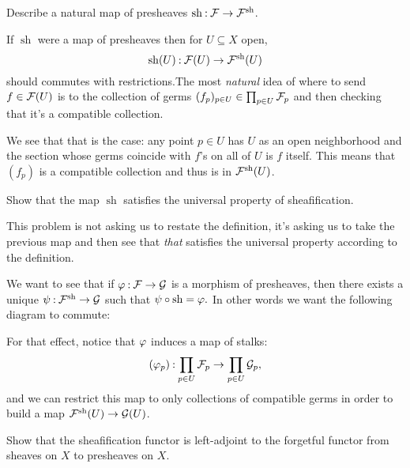 \documentclass[12pt]{memoir}
\DeclareMathOperator{\sh}{sh}
\begin{document}
\begin{Ej}[2.4.I. Vakil]
    Describe a natural map of presheaves $\text{sh}\mathbin{:}\mathcal{F}\to\mathcal{F}^{\text{sh}}$.
\end{Ej}

\begin{ptcbr}
    If $\sh$ were a map of presheaves then for $U\subseteq X$ open, 
    $$\sh(U)\:\cF(U)\to\cF^{\sh}(U)$$ 
    should commutes with restrictions.The most \emph{natural} idea of where to send $f\in\mathcal{F}(U)$ is to the collection of germs $(f_p)_{p\in U}\in \prod_{p\in U}\mathcal{F}_p$ and then checking that it's a compatible collection.\par 
    We see that that is the case: any point $p\in U$ has $U$ as an open neighborhood and the section whose germs coincide with $f$'s on all of $U$ is $f$ itself. This means that $(f_p)$ is a compatible collection and thus is in $\cF^{\sh}(U)$.\par
\end{ptcbr}

\begin{Ej}[2.4.J Vakil]
    Show that the map $\sh$ satisfies the universal property of sheafification.
\end{Ej}

\begin{ptcbr}
    This problem is not asking us to restate the definition, it's asking us to take the previous map and then see that \emph{that} satisfies the universal property according to the definition.\par 
    We want to see that if $\varphi\mathbin{:}\mathcal{F}\to\mathcal{G}$ is a morphism of presheaves, then there exists a unique $\psi\:\cF^{\sh}\to\cG$ such that $\psi\circ\sh=\vf.$
    In other words we want the following diagram to commute:
    \begin{center}
    \end{center}
    For that effect, notice that $\varphi$ induces a map of stalks:
    $$(\varphi_p)\mathbin{:}\prod_{p\in U}\mathcal{F}_p\to\prod_{p\in U}\mathcal{G}_p,$$
    and we can restrict this map to only collections of compatible germs in order to build a map $\cF^{\sh}(U)\to\cG(U)$. 
\end{ptcbr}
\begin{Ej}[2.4.K Vakil]
    Show that the sheafification functor is left-adjoint to the forgetful functor from sheaves on $X$ to presheaves on $X$.
\end{Ej}
\end{document}
